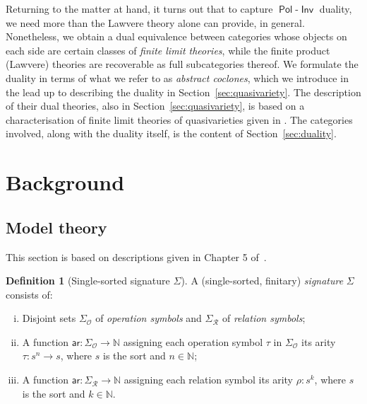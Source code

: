 \documentclass[11pt, a4paper, twoside,leqno]{amsart}
\renewcommand{\O}{{\mathcal O}}
\newcommand{\R}{{\mathcal R}}
\numberwithin{equation}{section}
\theoremstyle{plain}
\theoremstyle{definition}
\newtheorem{Defn}[Thm]{Definition}
\DeclareMathOperator{\Pol}{\mathsf{Pol}}
\DeclareMathOperator{\Inv}{\mathsf{Inv}}
\begin{document}
Returning to the matter at hand, it
turns
out that to capture \(\Pol\)-\(\Inv\) duality, we need more than the
Lawvere theory alone can provide, in general. Nonetheless, we obtain a dual equivalence between categories
whose objects on each side are certain classes of \emph{finite limit
  theories}, while the finite product (Lawvere) theories are
recoverable as full subcategories thereof. 
We formulate the duality in terms of what we refer to as \emph{abstract
  coclones}, which we introduce in the lead up to describing the
duality in Section~\ref{sec:quasivariety}. The description of their
dual theories, also in Section~\ref{sec:quasivariety}, is based on a characterisation
of finite limit
theories of quasivarieties given in \cite{Adamek:1998aa}. The
categories involved, along with the duality itself, is the content of Section~\ref{sec:duality}.



\section{Background}
\label{sec:background}



\subsection{Model theory}
\label{sec:logic-background}
This section is based on descriptions given in Chapter 5 of~\cite{Adamek:1994aa}.
\begin{Defn}[Single-sorted signature \(\Sigma\)]
  \label{def:1-signature}
  A (single-sorted, finitary) \emph{signature} \(\Sigma\) consists of:
  \begin{enumerate}[(i)]
  \item Disjoint sets \(\Sigma_{\O}\) of \emph{operation symbols} and
    \(\Sigma_{\R}\) of \emph{relation symbols};
  \item A function
    \(\mathsf{ar} \colon \Sigma_{\O}\rightarrow \mathbb{N}\)
    assigning each operation symbol \(\tau\) in \(\Sigma_{\O}\) its arity
    \(\tau \colon s^{n} \rightarrow s\), where
    \(s\) is the sort and \(n\in \mathbb{N}\);
  \item A function
    \(\mathsf{ar} \colon \Sigma_{\R}\rightarrow \mathbb{N}\)
    assigning each relation symbol its arity
    \(\rho \colon s^{k}\), where
    \(s\) is the sort and \(k \in \mathbb{N} \).
  \end{enumerate}
\end{Defn}
\end{document}

